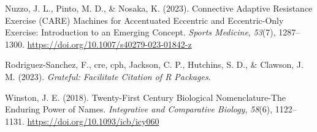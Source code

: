 \documentclass[
]{article}
\newlength{\cslhangindent}
\newenvironment{CSLReferences}[2] %
 {\begin{list}{}{%
  \setlength{\itemindent}{0pt}
  \setlength{\leftmargin}{0pt}
  \setlength{\parsep}{0pt}
  \ifodd #1
   \setlength{\leftmargin}{\cslhangindent}
   \setlength{\itemindent}{-1\cslhangindent}
  \fi
  \setlength{\itemsep}{#2\baselineskip}}}
 {\end{list}}
\begin{document}
\begin{CSLReferences}{1}{0}
Nuzzo, J. L., Pinto, M. D., \& Nosaka, K. (2023). Connective {Adaptive
Resistance Exercise} ({CARE}) {Machines} for {Accentuated Eccentric} and
{Eccentric-Only Exercise}: {Introduction} to an {Emerging Concept}.
\emph{Sports Medicine}, \emph{53}(7), 1287--1300.
\url{https://doi.org/10.1007/s40279-023-01842-z}

{Rodriguez-Sanchez, F., cre, cph, Jackson, C. P., Hutchins, S. D., \&
Clawson, J. M.} (2023). \emph{Grateful: {Facilitate Citation} of {R
Packages}}.

Winston, J. E. (2018). Twenty-{First Century Biological Nomenclature-The
Enduring Power} of {Names}. \emph{Integrative and Comparative Biology},
\emph{58}(6), 1122--1131. \url{https://doi.org/10.1093/icb/icy060}

\end{CSLReferences}
\end{document}
